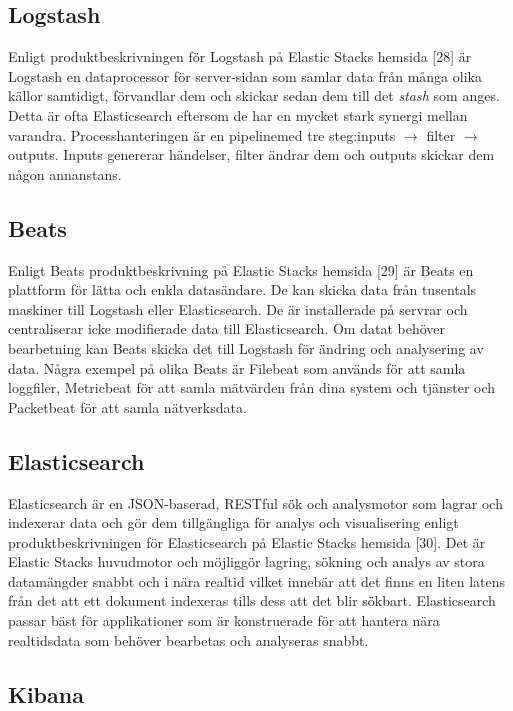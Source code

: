 \documentclass[12pt]{kththesis}
\begin{document}
\subsection{Logstash} 

Enligt produktbeskrivningen för Logstash på Elastic Stacks hemsida [28] är Logstash en dataprocessor för server-sidan som samlar data från många olika källor samtidigt, förvandlar dem och skickar sedan dem till det \textit{stash} som anges. Detta är ofta Elasticsearch eftersom de har en mycket stark synergi mellan varandra. Processhanteringen är en pipelinemed tre steg:inputs $\rightarrow$ filter $\rightarrow$ outputs. Inputs genererar händelser, filter ändrar dem och outputs skickar dem någon annanstans.

\subsection{Beats}

Enligt Beats produktbeskrivning på Elastic Stacks hemsida [29] är Beats en plattform för lätta och enkla datasändare. De kan skicka data från tusentals maskiner till Logstash eller Elasticsearch. De är installerade på servrar och centraliserar icke modifierade data till Elasticsearch. Om datat behöver bearbetning kan Beats skicka det till Logstash för ändring och analysering av data. Några exempel på olika Beats är Filebeat som används för att samla loggfiler, Metricbeat för att samla mätvärden från dina system och tjänster och Packetbeat för att samla nätverksdata. 

\subsection{Elasticsearch}

Elasticsearch är en JSON-baserad, RESTful sök och analysmotor som lagrar och indexerar data och gör dem tillgängliga för analys och visualisering enligt produktbeskrivningen för Elasticsearch på Elastic Stacks hemsida [30]. Det är Elastic Stacks huvudmotor och möjliggör lagring, sökning och analys av stora datamängder snabbt och i nära realtid vilket innebär att det finns en liten latens från det att ett dokument indexeras tills dess att det blir sökbart. Elasticsearch passar bäst för applikationer som är konstruerade för att hantera nära realtidsdata som behöver bearbetas och analyseras snabbt. 
 

\subsection{Kibana}
\end{document}
